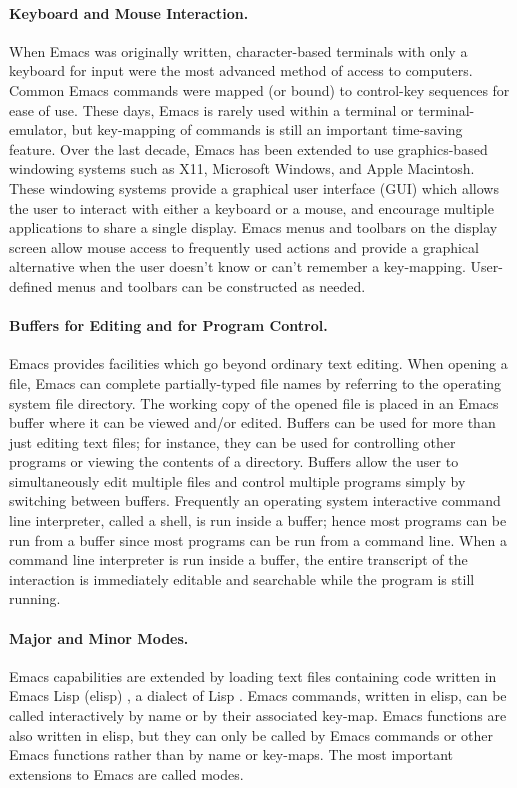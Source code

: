 \documentclass{article}
\begin{document}
\paragraph{Keyboard and Mouse Interaction.}
When Emacs was originally written, character-based terminals with only
a keyboard for input were the most advanced method of access to
computers.  Common Emacs commands were mapped (or bound) to control-key
sequences for ease of use.  These days, Emacs is
rarely used within a terminal or terminal-emulator, but key-mapping of
commands is still an important time-saving feature.  Over the last
decade, Emacs has been extended to use graphics-based windowing
systems such as X11, Microsoft Windows, and Apple Macintosh.  These
windowing systems provide a graphical user interface (GUI) which
allows the user to interact with either a keyboard or a mouse, and encourage
multiple applications to share a single display.  Emacs menus and
toolbars on the display screen allow mouse access to frequently used
actions and provide a graphical alternative
when the user doesn't know or can't remember a key-mapping.  User-defined
menus and toolbars can be constructed as needed.

\paragraph{Buffers for Editing and for Program Control.}
Emacs provides facilities which go beyond ordinary text editing.  When
opening a file, Emacs can complete partially-typed file names by
referring to the operating system file directory.  The working copy of
the opened file is placed in an Emacs buffer where it can be viewed
and/or edited.  Buffers can be used for more than just editing text
files; for instance, they can be used for controlling other programs
or viewing the contents of a directory.  Buffers allow the user to simultaneously
edit multiple files and control multiple
programs simply by switching between buffers.  Frequently an operating
system interactive command line interpreter, called a shell,
is run inside a buffer; hence most programs can be run from a buffer
since most programs can be run from a command line.  When a command line
interpreter is run inside a buffer, the entire
transcript of the interaction is immediately editable and searchable while the
program is still running.

\paragraph{Major and Minor Modes.}
Emacs capabilities are extended by loading text files containing code
written in Emacs Lisp (elisp) \citep{RChassell1999}, a dialect of Lisp
\citep{PGraham:1996}.  Emacs commands, written in elisp,
can be called interactively by name or by their associated key-map.
Emacs functions are also written in elisp, but they can only be called
by Emacs commands or other Emacs functions rather than by
name or key-maps.  The most important extensions to Emacs are called
modes.
\end{document}
